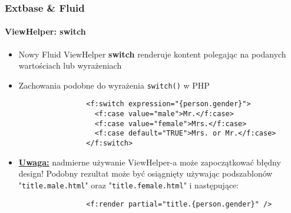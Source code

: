 \begin{frame}[fragile]
	\frametitle{Extbase \& Fluid}
	\framesubtitle{ViewHelper: switch}

	\lstset{
		basicstyle=\smaller\ttfamily
	}

	\begin{itemize}
		\item Nowy Fluid ViewHelper \textbf{switch} renderuje kontent polegając na podanych wartościach lub wyrażeniach
		\item Zachowania podobne do wyrażenia \texttt{switch()} w PHP

			\begin{lstlisting}
				<f:switch expression="{person.gender}">
				  <f:case value="male">Mr.</f:case>
				  <f:case value="female">Mrs.</f:case>
				  <f:case default="TRUE">Mrs. or Mr.</f:case>
				</f:switch>
			\end{lstlisting}

		\item \textbf{\underline{Uwaga:}} nadmierne używanie ViewHelper-a może zapoczątkować błędny design! Podobny rezultat może być osiągnięty używając podszablonów "\texttt{title.male.html}" oraz "\texttt{title.female.html}" i następujące:

			\begin{lstlisting}
				<f:render partial="title.{person.gender}" />
			\end{lstlisting}

	\end{itemize}

\end{frame}


